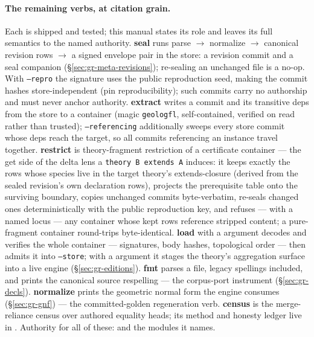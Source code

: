 \paragraph{The remaining verbs, at citation grain.} Each is shipped
and tested; this manual states its role and leaves its full
semantics to the named authority. \textbf{seal} runs parse $\to$
normalize $\to$ canonical revision rows $\to$ a signed envelope pair
in the store: a revision commit and a seal companion
(\S\ref{sec:gr-meta-revisions}); re-sealing an unchanged file is a
no-op. With \texttt{--repro} the signature uses the public
reproduction seed, making the commit hashes store-independent (pin
reproducibility); such commits carry no authorship and must never
anchor authority. \textbf{extract} writes a commit and its transitive deps from
the store to a  container (magic \texttt{geologfl},
self-contained, verified on read rather than trusted);
\texttt{--referencing} additionally sweeps every store commit whose
deps reach the target, so all commits referencing an instance travel
together. \textbf{restrict} is theory-fragment restriction of a
certificate container — the get side of the delta lens a
\texttt{theory B extends A} induces: it keeps exactly the rows whose
species live in the target theory's extends-closure (derived from
the sealed revision's own declaration rows), projects the
prerequisite table onto the surviving boundary, copies unchanged
commits byte-verbatim, re-seals changed ones deterministically with
the public reproduction key, and refuses — with a named locus — any
container whose kept rows reference stripped content; a
pure-fragment container round-trips byte-identical. \textbf{load}
with a  argument decodes and
verifies the whole container — signatures, body hashes, topological
order — then admits it into \texttt{--store}; with a
 argument it stages the theory's aggregation surface
into a live engine (\S\ref{sec:gr-editions}). \textbf{fmt} parses a
file, legacy spellings included, and prints the canonical source
respelling — the corpus-port instrument (\S\ref{sec:gr-decls}).
\textbf{normalize} prints the geometric normal form the engine
consumes (\S\ref{sec:gr-gnf}) — the committed-golden regeneration
verb. \textbf{census} is the merge-reliance census over authored
equality heads; its method and honesty ledger live in
. Authority for all of these:
 and the modules it names.

